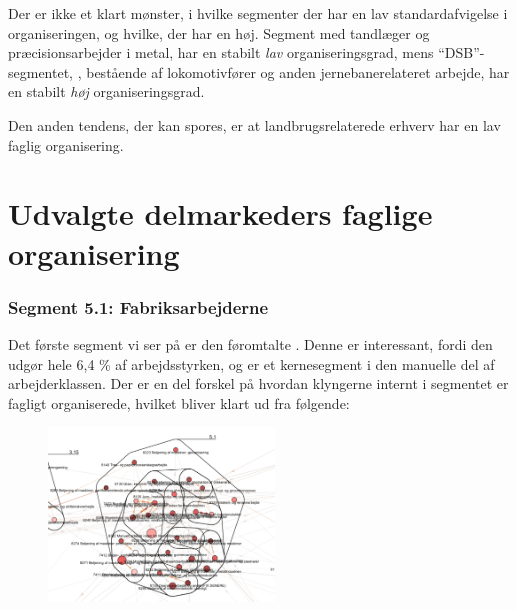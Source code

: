 Der er ikke et klart mønster, i hvilke segmenter der har en lav standardafvigelse i organiseringen, og hvilke, der har en høj. Segment  med tandlæger og præcisionsarbejder i metal, har en stabilt \emph{lav} organiseringsgrad, mens “DSB”-segmentet, , bestående af lokomotivfører og anden jernebanerelateret arbejde, har en stabilt \emph{høj} organiseringsgrad. 

Den anden tendens, der kan spores, er at landbrugsrelaterede erhverv har en lav faglig organisering.

\section{Udvalgte delmarkeders faglige organisering \label{sec_delanalyse2 udvalgtedelmarkeder fagforening}}

%
\subsubsection{Segment 5.1: Fabriksarbejderne}
%




Det første segment vi ser på er den føromtalte . Denne er interessant, fordi den udgør hele 6,4 \% af arbejdsstyrken, og er et kernesegment i den manuelle del af arbejderklassen. Der er en del forskel på hvordan klyngerne internt i segmentet er fagligt organiserede, hvilket bliver klart ud fra følgende:


%
\begin{figure}
  \vspace{-20pt}
  \begin{center}
    \includegraphics[width=6cm]{fig/segzoom/seg_5_1_roede.pdf}
   \caption{}
   \label{fig_delanalyse2_zoom_3_4 koen}
  \end{center}
  \vspace{-20pt}
\end{figure}
%

